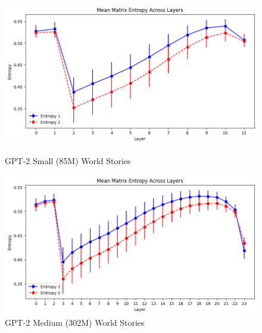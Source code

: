 \documentclass{article}
\begin{document}
\begin{figure} [H]
    \centering
    \begin{minipage}{0.5\linewidth}
        \includegraphics[width=\linewidth]{Small_World_Stories.png}
        \caption{GPT-2 Small (85M) World Stories}
        \label{fig:small_world_stories}
    \end{minipage}\hfill
    \begin{minipage}{0.5\linewidth}
        \includegraphics[width=\linewidth]{Medium_World_Stories.png}
        \caption{GPT-2 Medium (302M) World Stories}
        \label{fig:medium_world_stories}
    \end{minipage}\hfill
\end{figure}
\end{document}
